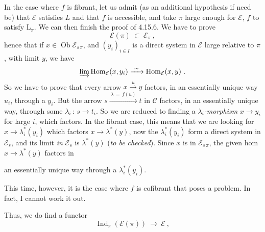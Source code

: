 \documentclass[11pt]{article}
\newcommand{\msp}[1]{\marginpar{\footnotesize [#1]}}
\newcommand{\cE}{\mathcal{E}}
\newcommand{\cC}{\mathcal{C}}
\newcommand{\Ob}{\operatorname{Ob}}
\newcommand{\Hom}{\operatorname{Hom}}
\newcommand{\Ind}{\operatorname{Ind}}
\begin{document}
\msp{page 439}In the case where $f$ is fibrant, let us admit (as an additional hypothesis if need be) that $\cE$ satisfies $L$ and that $f$ is accessible, and take $\pi$ large enough for $\cE$, $f$ to satisfy $\mathrm{L}_{\pi}$. We can then finish the proof of 4.15.6. We have to prove
\[
\cE(\pi) \ \subset \ \cE_{\pi} \ ,
\]
hence that if $x \in \Ob \cE_{s\,\pi}$, and $(y_i)_{i \in I}$ is a direct system in $\cE$ large relative to $\pi$, with limit $y$, we have
\[
\varinjlim \Hom_{\cE}(x, y_i) \xrightarrow{\ \sim\ } \Hom_{\cE}(x, y) \ .
\]
So we have to prove that every arrow $x \xrightarrow{u} y$ factors, in an essentially unique way $u_i$, through a $y_i$. But the arrow $s \xrightarrow{\ \lambda \, = \, f(u)\ } t$ in $\cC$ factors, in an essentially unique way, through some $\lambda_i \, : \, s \longrightarrow t_i$. So we are reduced to finding a \textit{$\lambda_i$-morphism} $x \longrightarrow y_i$ for large $i$, which factors. In the fibrant case, this means that we are looking for $x \longrightarrow \lambda^*_i(y_i)$ which factors $x \longrightarrow \lambda^*(y)$, now the $\lambda^*_i(y_i)$ form a direct system in $\cE_s$, and its limit \textit{in} $\cE_s$ is $\lambda^*(y)$ (\textit{to be checked}). Since $x$ is in $\cE_{s\,\pi}$, the given hom $x \longrightarrow \lambda^*(y)$ factors in

\msp{page 440}an essentially unique way through a $\lambda^*_i(y_i)$.

This time, however, it is the case where $f$ is cofibrant that poses a problem. In fact, I cannot work it out.

Thus, we do find a functor
\[
\Ind_{\pi}(\cE(\pi)) \ \longrightarrow \ \cE \ ,
\]
\end{document}
